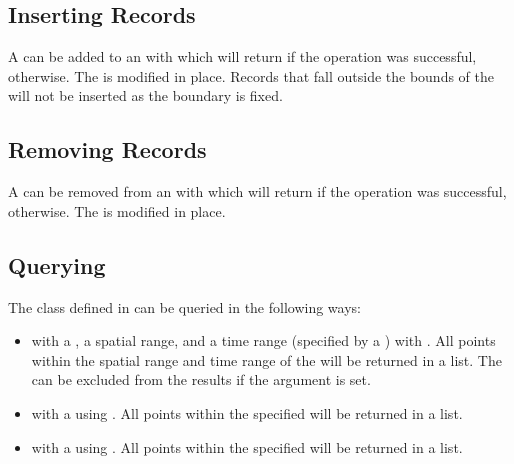 \documentclass[letterpaper,10pt,english]{sphinxmanual}
\begin{document}
\subsection{Inserting Records}
\label{\detokenize{octtree:inserting-records}}
\sphinxAtStartPar
A  can be added to an  with  which will return  if the operation
was successful,  otherwise. The  is modified in place. Records that fall outside the bounds of the
 will not be inserted as the boundary is fixed.


\subsection{Removing Records}
\label{\detokenize{octtree:removing-records}}
\sphinxAtStartPar
A  can be removed from an  with  which will return  if the operation
was successful,  otherwise. The  is modified in place.


\subsection{Querying}
\label{\detokenize{octtree:querying}}
\sphinxAtStartPar
The  class defined in  can be queried in the following ways:
\begin{itemize}
\item {}
\sphinxAtStartPar
with a , a spatial range, and a time range (specified by a ) with
. All points within the spatial range and time range of the  will be
returned in a list. The  can be excluded from the results if the 
argument is set.

\item {}
\sphinxAtStartPar
with a  using . All points within the specified  will be returned in a list.

\item {}
\sphinxAtStartPar
with a  using . All points within the specified  will be returned in a list.

\end{itemize}
\end{document}
